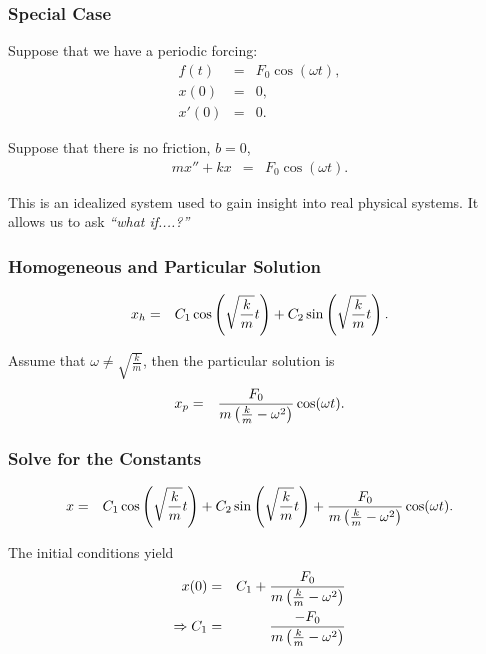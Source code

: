 \begin{frame}
  \frametitle{Special Case}

  Suppose that we have a periodic forcing:
  \begin{eqnarray*}
    f(t) & = & F_0 \cos(\omega t), \\
    x(0) & = & 0, \\
    x'(0) & = & 0.
  \end{eqnarray*}

  Suppose that there is no friction, $b=0$,
  \begin{eqnarray*}
    m x'' + kx & = & F_0 \cos(\omega t).
  \end{eqnarray*}

  This is an idealized system used to gain insight into real physical
  systems. It allows us to ask \textit{``what if....?''}

\end{frame}


\begin{frame}
  \frametitle{Homogeneous and Particular Solution}

  \begin{eqnarray*}
    x_h & = & C_1 \cos\left(\sqrt{\frac{k}{m}}t\right) + C_2 \sin\left(\sqrt{\frac{k}{m}}t\right).
  \end{eqnarray*}

  Assume that $\omega \neq \sqrt{\frac{k}{m}}$, then the particular
  solution is
  \begin{eqnarray*}
    x_p & = & \frac{F_0}{m\left(\frac{k}{m}-\omega^2\right)} \cos(\omega t).
  \end{eqnarray*}


\end{frame}


\begin{frame}
  \frametitle{Solve for the Constants}

  \begin{eqnarray*}
    x & = & C_1 \cos\left(\sqrt{\frac{k}{m}}t\right) + C_2 \sin\left(\sqrt{\frac{k}{m}}t\right)+
           \frac{F_0}{m\left(\frac{k}{m}-\omega^2\right)} \cos(\omega t).
  \end{eqnarray*}

  The initial conditions yield
  \begin{eqnarray*}
    x(0) & = & C_1 + \frac{F_0}{m\left(\frac{k}{m}-\omega^2\right)} \\
    \Rightarrow C_1 & = & \frac{-F_0}{m\left(\frac{k}{m}-\omega^2\right)}
  \end{eqnarray*}

\end{frame}


